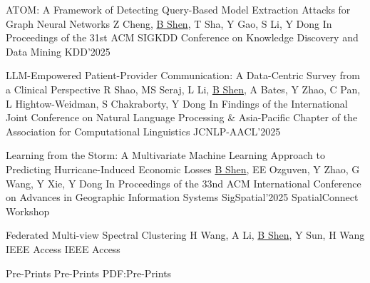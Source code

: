 \BigGap
\NumberedItem{[4]}
{\PaperEntry
    {ATOM: A Framework of Detecting Query-Based Model Extraction Attacks for Graph Neural Networks}
    {Z Cheng, \underline{B Shen}, T Sha, Y Gao, S Li, Y Dong}
    {In Proceedings of the 31st ACM SIGKDD Conference on Knowledge Discovery and Data Mining}
    {KDD'2025}
    {}
}

\BigGap
\NumberedItem{[3]}
{\PaperEntry
    {LLM-Empowered Patient-Provider Communication: A Data-Centric Survey from a Clinical Perspective}
    {R Shao, MS Seraj, L Li, \underline{B Shen}, A Bates, Y Zhao, C Pan, L Hightow-Weidman, S Chakraborty, Y Dong}
    {In Findings of the International Joint Conference on Natural Language Processing \& Asia-Pacific Chapter of the Association for Computational Linguistics}
    {JCNLP-AACL'2025}
    {}
}

\BigGap
\NumberedItem{[2]}
{\PaperEntry
    {Learning from the Storm: A Multivariate Machine Learning Approach to Predicting Hurricane-Induced Economic Losses}
    {\underline{B Shen}, EE Ozguven, Y Zhao, G Wang, Y Xie, Y Dong}
    {In Proceedings of the 33nd ACM International Conference on Advances in Geographic Information Systems}
    {SigSpatial'2025 SpatialConnect Workshop}
    {}
}

\BigGap
\NumberedItem{[1]}
{\PaperEntry
    {Federated Multi-view Spectral Clustering}
    {H Wang, A Li, \underline{B Shen}, Y Sun, H Wang}
    {IEEE Access}
    {IEEE Access}
    {}
}

 
\endgroup











\BigGap


\SubSection
{Pre-Prints}
{Pre-Prints}
{PDF:Pre-Prints}

